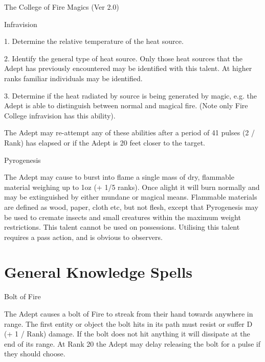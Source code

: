 \begin{Chapter}{The College of Fire Magics (Ver 2.0)}
\begin{talent}[T-1]{Infravision}
\begin{effects}
1. Determine the relative temperature of the heat source.

2. Identify the general type of heat source.  Only those heat sources
that the Adept has previously encountered may be identified with this
talent.  At higher ranks familiar individuals may be identified.

3. Determine if the heat radiated by source is being generated by
magic, e.g.  the Adept is able to distinguish between normal and
magical fire.  (Note only Fire College infravision has this ability).

The Adept may re-attempt any of these abilities after a period of 41
pulses (2 / Rank) has elapsed or if the Adept is 20 feet closer to the
target.
\end{effects}
\end{talent}

\begin{talent}[T-2]{Pyrogenesis}

\begin{effects}
The Adept may cause to burst into flame a single mass of dry,
flammable material weighing up to 1oz (+ 1/5 ranks). Once alight it
will burn normally and may be extinguished by either mundane or
magical means.  Flammable materials are defined as wood, paper, cloth
etc, but not flesh, except that Pyrogenesis may be used to cremate
insects and small creatures within the maximum weight restrictions.
This talent cannot be used on possessions. Utilising this talent
requires a pass action, and is obvious to observers.
\end{effects}
\end{talent}

\section{General Knowledge Spells}

\begin{spell}[G-1]{Bolt of Fire}

\begin{effects}
The Adept causes a bolt of Fire to streak from their hand towards
anywhere in range.  The first entity or object the bolt hits in its
path must resist or suffer D (+ 1 / Rank) damage.  If the bolt does
not hit anything it will dissipate at the end of its range. At Rank 20
the Adept may delay releasing the bolt for a pulse if they should
choose.


\end{effects}
\end{spell}
\end{Chapter}
